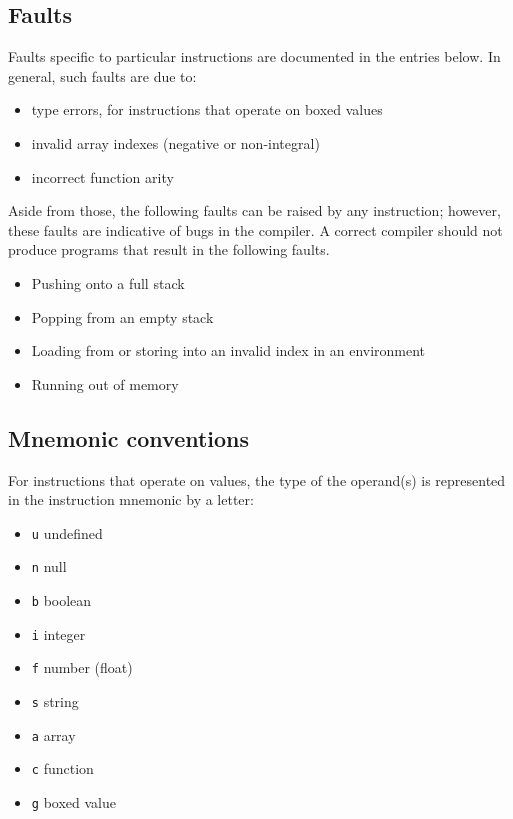 \subsection{Faults}

Faults specific to particular instructions are documented in the entries
below. In general, such faults are due to:

\begin{itemize}
\item
  type errors, for instructions that operate on boxed values
\item
  invalid array indexes (negative or non-integral)
\item
  incorrect function arity
\end{itemize}

Aside from those, the following faults can be raised by any instruction;
however, these faults are indicative of bugs in the compiler. A correct
compiler should not produce programs that result in the following
faults.

\begin{itemize}
\item
  Pushing onto a full stack
\item
  Popping from an empty stack
\item
  Loading from or storing into an invalid index in an environment
\item
  Running out of memory
\end{itemize}

\subsection{Mnemonic conventions}

For instructions that operate on values, the type of the operand(s) is
represented in the instruction mnemonic by a letter:

\begin{itemize}
\item
  \texttt{u} undefined
\item
  \texttt{n} null
\item
  \texttt{b} boolean
\item
  \texttt{i} integer
\item
  \texttt{f} number (float)
\item
  \texttt{s} string
\item
  \texttt{a} array
\item
  \texttt{c} function
\item
  \texttt{g} boxed value
\end{itemize}

